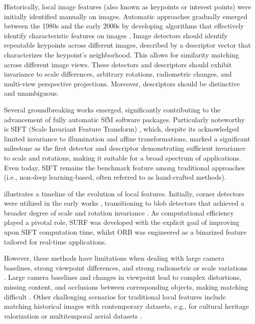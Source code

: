 Historically, local image features (also known as keypoints or interest points) were initially identified manually on images.
Automatic approaches gradually emerged between the 1980s and the early 2000s by developing algorithms that effectively identify characteristic features on images \citep{Lowe2004}.
Image detectors should identify repeatable keypoints across different images, described by a descriptor vector that characterizes the keypoint's neighborhood. 
This allows for similarity matching across different image views. 
These detectors and descriptors should exhibit invariance to scale differences, arbitrary rotations, radiometric changes, and multi-view perspective projections. 
Moreover, descriptors should be distinctive and unambiguous.  

Several groundbreaking works emerged, significantly contributing to the advancement of fully automatic SfM software packages. 
Particularly noteworthy is SIFT (Scale Invariant Feature Transform) \citep{Lowe2004}, which, despite its acknowledged limited invariance to illumination and affine transformations, marked a significant milestone as the first detector and descriptor demonstrating sufficient invariance to scale and rotations, making it suitable for a broad spectrum of applications. 
Even today, SIFT remains the benchmark feature among traditional approaches (i.e., non-deep learning-based, often referred to as hand-crafted methods)\citep{jin_image_2021}. 

 illustrates a timeline of the evolution of local features. 
Initially, corner detectors were utilized in the early works \citep{Harris1988ACC}, transitioning to blob detectors that achieved a broader degree of scale and rotation invariance \citep{Lowe2004}. 
As computational efficiency played a pivotal role, SURF \citep{bay_surf_2006} was developed with the explicit goal of improving upon SIFT computation time, whilst ORB \citep{Rublee2011} was engineered as a binarized feature tailored for real-time applications. 

However, these methods have limitations when dealing with large camera baselines, strong viewpoint differences, and strong radiometric or scale variations \citep{Yao_2021}. 
Large camera baselines and changes in viewpoint lead to complex distortions, missing content, and occlusions between corresponding objects, making matching difficult \citep{jin_image_2021, ioli2024deep}.
Other challenging scenarios for traditional local features include matching historical images with contemporary datasets, e.g., for cultural heritage valorization \citep{Maiwald2021_Historical, Maiwald2023_HAI-SFM} or multitemporal aerial datasets \citep{Farella2022, Zhang2021_featmatc_histo}.

